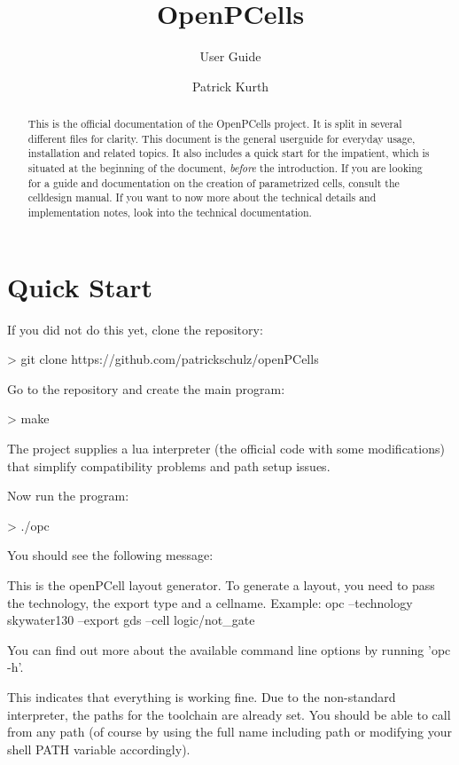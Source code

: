 

\title{OpenPCells}
\subtitle{User Guide}
\author{Patrick Kurth}



\maketitle
\begin{abstract}
    \noindent This is the official documentation of the OpenPCells project.  It is split in several different files for clarity. 
    This document is the general userguide for everyday usage, installation and related topics. It also includes a quick start for the impatient, which is situated
    at the beginning of the document, \emph{before} the introduction.
    If you are looking for a guide and documentation on the creation of parametrized cells, consult the celldesign manual.
    If you want to now more about the technical details and implementation notes, look into the technical documentation.
\end{abstract}

\tableofcontents

\section{Quick Start}
If you did not do this yet, clone the repository:
\begin{shellcode}
    > git clone https://github.com/patrickschulz/openPCells
\end{shellcode}
Go to the repository and create the main program:
\begin{shellcode}
    > make
\end{shellcode}
The project supplies a lua interpreter (the official code with some modifications) that simplify compatibility problems and path setup issues.

Now run the program:
\begin{shellcode}
    > ./opc
\end{shellcode}
You should see the following message:
\begin{shellcode}
    This is the openPCell layout generator.
    To generate a layout, you need to pass the technology, the export type and a cellname.
    Example:
             opc --technology skywater130 --export gds --cell logic/not_gate

    You can find out more about the available command line options by running 'opc -h'.
\end{shellcode}
This indicates that everything is working fine. Due to the non-standard interpreter, the paths for the toolchain are already set. You should be able to call
 from any path (of course by using the full name including path or modifying your shell PATH variable accordingly).

